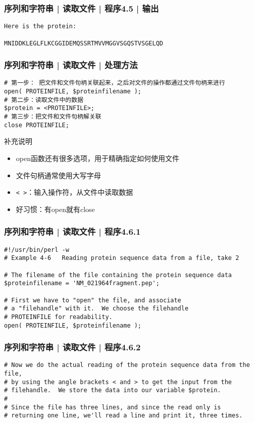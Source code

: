 \begin{frame}[fragile]
  \frametitle{序列和字符串 | 读取文件 | 程序4.5 | 输出}
\begin{lstlisting}
Here is the protein:

MNIDDKLEGLFLKCGGIDEMQSSRTMVVMGGVSGQSTVSGELQD
\end{lstlisting}
\end{frame}

\begin{frame}[fragile]
  \frametitle{序列和字符串 | 读取文件 | \alert{处理方法}}
\begin{lstlisting}
# 第一步： 把文件和文件句柄关联起来，之后对文件的操作都通过文件句柄来进行
open( PROTEINFILE, $proteinfilename );
# 第二步：读取文件中的数据
$protein = <PROTEINFILE>;
# 第三步：把文件和文件句柄解关联
close PROTEINFILE;
\end{lstlisting}
\pause
\begin{block}{补充说明}
  \begin{itemize}
    \item open函数还有很多选项，用于精确指定如何使用文件
    \item 文件句柄通常使用大写字母
    \item \verb|< >|：输入操作符，从文件中读取数据
    \item 好习惯：有open就有close
  \end{itemize}
\end{block}
\end{frame}

\begin{frame}[fragile]
  \frametitle{序列和字符串 | 读取文件 | 程序4.6.1}
\begin{lstlisting}
#!/usr/bin/perl -w
# Example 4-6   Reading protein sequence data from a file, take 2

# The filename of the file containing the protein sequence data
$proteinfilename = 'NM_021964fragment.pep';

# First we have to "open" the file, and associate
# a "filehandle" with it.  We choose the filehandle
# PROTEINFILE for readability.
open( PROTEINFILE, $proteinfilename );
\end{lstlisting}
\end{frame}

\begin{frame}[fragile]
  \frametitle{序列和字符串 | 读取文件 | 程序4.6.2}
\begin{lstlisting}[firstnumber=12]
# Now we do the actual reading of the protein sequence data from the file,
# by using the angle brackets < and > to get the input from the
# filehandle.  We store the data into our variable $protein.
#
# Since the file has three lines, and since the read only is
# returning one line, we'll read a line and print it, three times.
\end{lstlisting}
\end{frame}

